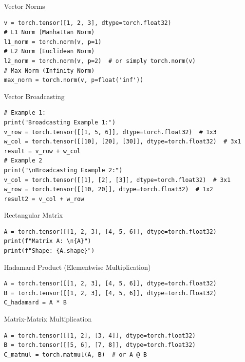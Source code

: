 \documentclass[aspectratio=169,xcolor=dvipsnames,svgnames,x11names,fleqn]{beamer}
\begin{document}
\begin{frame}[containsverbatim]{Vector Norms}
\begin{verbatim}
v = torch.tensor([1, 2, 3], dtype=torch.float32)
# L1 Norm (Manhattan Norm)
l1_norm = torch.norm(v, p=1)
# L2 Norm (Euclidean Norm)
l2_norm = torch.norm(v, p=2)  # or simply torch.norm(v)
# Max Norm (Infinity Norm)
max_norm = torch.norm(v, p=float('inf'))
\end{verbatim}
\end{frame}

\begin{frame}[containsverbatim]{Vector Broadcasting}
\begin{verbatim}
# Example 1:
print("Broadcasting Example 1:")
v_row = torch.tensor([[1, 5, 6]], dtype=torch.float32)  # 1x3
w_col = torch.tensor([[10], [20], [30]], dtype=torch.float32)  # 3x1
result = v_row + w_col
# Example 2
print("\nBroadcasting Example 2:")
v_col = torch.tensor([[1], [2], [3]], dtype=torch.float32)  # 3x1
w_row = torch.tensor([[10, 20]], dtype=torch.float32)  # 1x2
result2 = v_col + w_row
\end{verbatim}
\end{frame}

\begin{frame}[containsverbatim]{Rectangular Matrix}
\begin{verbatim}
A = torch.tensor([[1, 2, 3], [4, 5, 6]], dtype=torch.float32)
print(f"Matrix A: \n{A}")
print(f"Shape: {A.shape}")
\end{verbatim}
\end{frame}

\begin{frame}[containsverbatim]{Hadamard Product (Elementwise Multiplication)}
\begin{verbatim}
A = torch.tensor([[1, 2, 3], [4, 5, 6]], dtype=torch.float32)
B = torch.tensor([[1, 2, 3], [4, 5, 6]], dtype=torch.float32)
C_hadamard = A * B
\end{verbatim}
\end{frame}


\begin{frame}[containsverbatim]{Matrix-Matrix Multiplication}
\begin{verbatim}
A = torch.tensor([[1, 2], [3, 4]], dtype=torch.float32)
B = torch.tensor([[5, 6], [7, 8]], dtype=torch.float32)
C_matmul = torch.matmul(A, B)  # or A @ B
\end{verbatim}
\end{frame}
\end{document}
